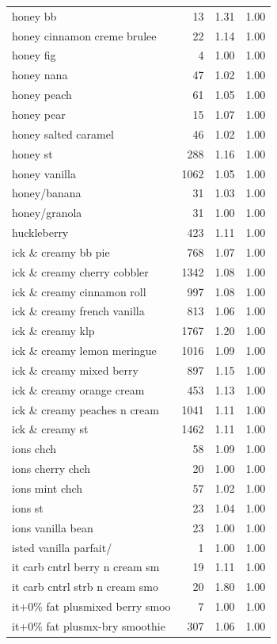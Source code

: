\begin{table}
\begin{tabular}{lrrr}
honey bb & 13 & 1.31 & 1.00 \\
honey cinnamon creme brulee & 22 & 1.14 & 1.00 \\
honey fig & 4 & 1.00 & 1.00 \\
honey nana & 47 & 1.02 & 1.00 \\
honey peach & 61 & 1.05 & 1.00 \\
honey pear & 15 & 1.07 & 1.00 \\
honey salted caramel & 46 & 1.02 & 1.00 \\
honey st & 288 & 1.16 & 1.00 \\
honey vanilla & 1062 & 1.05 & 1.00 \\
honey/banana & 31 & 1.03 & 1.00 \\
honey/granola & 31 & 1.00 & 1.00 \\
huckleberry & 423 & 1.11 & 1.00 \\
ick \& creamy bb pie & 768 & 1.07 & 1.00 \\
ick \& creamy cherry cobbler & 1342 & 1.08 & 1.00 \\
ick \& creamy cinnamon roll & 997 & 1.08 & 1.00 \\
ick \& creamy french vanilla & 813 & 1.06 & 1.00 \\
ick \& creamy klp & 1767 & 1.20 & 1.00 \\
ick \& creamy lemon meringue & 1016 & 1.09 & 1.00 \\
ick \& creamy mixed berry & 897 & 1.15 & 1.00 \\
ick \& creamy orange cream & 453 & 1.13 & 1.00 \\
ick \& creamy peaches n cream & 1041 & 1.11 & 1.00 \\
ick \& creamy st & 1462 & 1.11 & 1.00 \\
ions chch & 58 & 1.09 & 1.00 \\
ions cherry chch & 20 & 1.00 & 1.00 \\
ions mint chch & 57 & 1.02 & 1.00 \\
ions st & 23 & 1.04 & 1.00 \\
ions vanilla bean & 23 & 1.00 & 1.00 \\
isted vanilla parfait/ & 1 & 1.00 & 1.00 \\
it carb cntrl berry n cream sm & 19 & 1.11 & 1.00 \\
it carb cntrl strb n cream smo & 20 & 1.80 & 1.00 \\
it+0\% fat plusmixed berry smoo & 7 & 1.00 & 1.00 \\
it+0\% fat plusmx-bry smoothie & 307 & 1.06 & 1.00 \\

\end{tabular}
\end{table}
